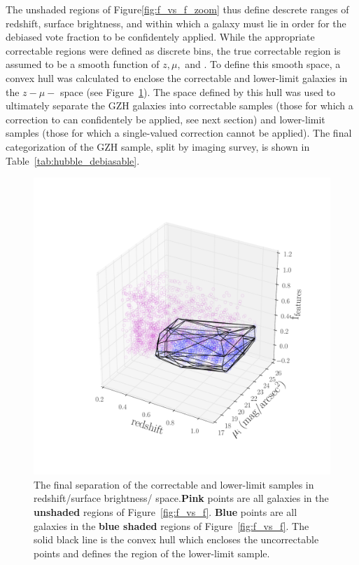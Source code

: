 The unshaded regions of Figure\ref{fig:f_vs_f_zoom} thus define descrete ranges of redshift, surface brightness, and \ffeatures{} within which a galaxy must lie in order for the debiased vote fraction to be confidentely applied. While the appropriate correctable regions were defined as discrete bins, the true correctable region is assumed to be a smooth function of $z, \mu,$ and \ffeatures{}. To define this smooth space, a convex hull was calculated to enclose the correctable and lower-limit \ferengi{} galaxies in the $z-\mu-$\ffeatures{} space (see Figure~\ref{fig:hull}). The space defined by this hull was used to ultimately separate the GZH galaxies into correctable samples (those for which a correction to \ffeatures{} can confidentely be applied, see next section) and lower-limit samples (those for which a single-valued correction cannot be applied). The final categorization of the GZH sample, split by imaging survey, is shown in Table~\ref{tab:hubble_debiasable}. 
\begin{figure}
\centering
\includegraphics[width=\textwidth]{figures/convex_hull.pdf}
\caption{The final separation of the correctable and lower-limit samples in redshift/surface brightness/\ffeatures{} space.\textbf{Pink} points are all \ferengi{} galaxies in the \textbf{unshaded} regions of Figure~\ref{fig:f_vs_f}. \textbf{Blue} points are all \ferengi{} galaxies in the \textbf{blue shaded} regions of Figure~\ref{fig:f_vs_f}. The solid black line is the convex hull which encloses the uncorrectable points and defines the region of the lower-limit sample. }
\label{fig:hull}
\end{figure}



